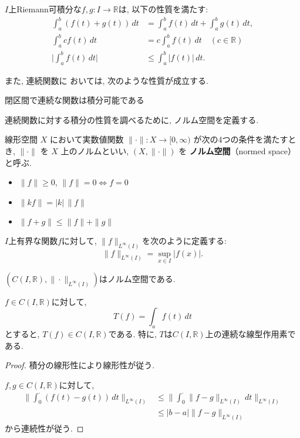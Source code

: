 \documentclass[12pt,xelatex,ja=standard]{bxjsarticle}
\begin{document}
\begin{Lemma}[定積分の基本的性質]
$I$上Riemann可積分な$f,g :I → ℝ$は,
以下の性質を満たす:
	\begin{align*}
	\int_{a}^{b} (f(t) + g(t)) \, dt
	&= \int_{a}^{b} f(t) \, dt + \int_{a}^{b} g(t) \, dt,\\
	\int_{a}^{b} c f(t) \, dt
	&= c \int_{a}^{b} f(t) \, dt \quad ( c \in \mathbb R)\\
	\bigg| \int_{a}^{b} f(t) \, dt \bigg|
	&\leq \displaystyle \int_{a}^{b} |f(t)| \, dt.
	\end{align*}
\end{Lemma}

また, 連続関数に おいては, 次のような性質が成立する.

\begin{Lemma}
閉区間で連続な関数は積分可能である
\end{Lemma}

連続関数に対する積分の性質を調べるために,
ノルム空間を定義する.

\begin{Definition}[ノルム空間]
線形空間 $X$ において実数値関数 $\|\cdot\|: X \to \lbrack 0, \infty)$
が次の4つの条件を満たすとき,
$\|\cdot\|$ を $X$ 上のノルムといい,
$(X,\|\cdot\|)$ を \textbf{ノルム空間}（normed space）と呼ぶ.
\begin{itemize}
\item $\|f\| \geq 0$, $\|f\| = 0 \Leftrightarrow f = 0$
\item $\|kf\| = |k| \, \|f\|$
\item $\|f+g\| \leq \|f\| + \|g\|$
\end{itemize}
\end{Definition}

\begin{Definition}[一様ノルム]
$I$上有界な関数$f$に対して,
$\|f\|_{L^\infty(I)}$を次のように定義する:
	\[
	\|f\|_{L^\infty(I)} = \sup_{x \in I} |f(x)|.
	\]
\end{Definition}

\begin{Proposition}
$(C(I,\mathbb{R}), \|\cdot\|_{L^\infty(I)})$はノルム空間である.
\end{Proposition}

\begin{Theorem}
$f \in C(I, \mathbb R)$に対して,
	\[
	T(f) = \int_a^{\cdot} f(t) \, dt
	\]
とすると,
$T(f) \in C(I, \mathbb R)$である.
特に, $T$は$C(I, \mathbb R)$上の連続な線型作用素である.
\end{Theorem}
\begin{proof}
積分の線形性により線形性が従う.

$f,g \in C(I, \mathbb R)$に対して,
	\begin{align*}
	\bigg\| \int_0^{\cdot} (f(t) - g(t)) \, dt \bigg\|_{L^\infty(I)}
	&\leq \bigg\|
		\int_0^{\cdot} \|f - g\|_{L^\infty(I)} \, dt
	\bigg\|_{L^\infty(I)}\\
	&\leq |b-a| \|f - g\|_{L^\infty(I)}
	\end{align*}
から連続性が従う.
\end{proof}
\end{document}

